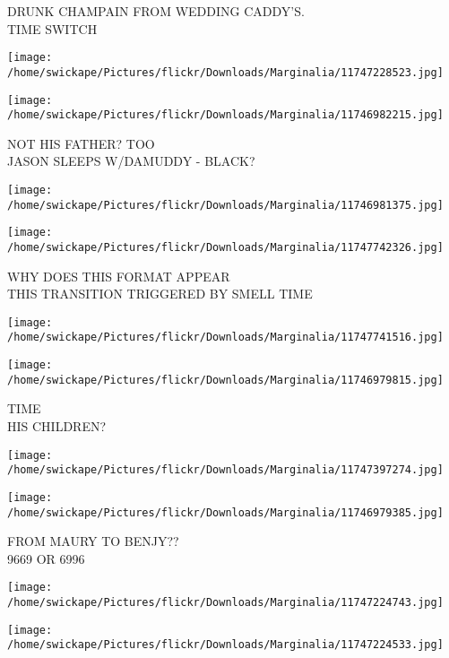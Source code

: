 \documentclass[10pt,letterpaper]{article}
\begin{document}
DRUNK CHAMPAIN FROM WEDDING CADDY'S.\\
TIME SWITCH\\
\pagebreak

\texttt{[image: /home/swickape/Pictures/flickr/Downloads/Marginalia/11747228523.jpg]}

\vspace{0.25in}
\texttt{[image: /home/swickape/Pictures/flickr/Downloads/Marginalia/11746982215.jpg]}

NOT HIS FATHER? TOO\\
JASON SLEEPS W/DAMUDDY {-} BLACK?\\
\pagebreak

\texttt{[image: /home/swickape/Pictures/flickr/Downloads/Marginalia/11746981375.jpg]}

\vspace{0.25in}
\texttt{[image: /home/swickape/Pictures/flickr/Downloads/Marginalia/11747742326.jpg]}

WHY DOES THIS FORMAT APPEAR\\
THIS TRANSITION TRIGGERED BY SMELL TIME\\
\pagebreak

\texttt{[image: /home/swickape/Pictures/flickr/Downloads/Marginalia/11747741516.jpg]}

\vspace{0.25in}
\texttt{[image: /home/swickape/Pictures/flickr/Downloads/Marginalia/11746979815.jpg]}

TIME\\
HIS CHILDREN?\\
\pagebreak

\texttt{[image: /home/swickape/Pictures/flickr/Downloads/Marginalia/11747397274.jpg]}

\vspace{0.25in}
\texttt{[image: /home/swickape/Pictures/flickr/Downloads/Marginalia/11746979385.jpg]}

FROM MAURY TO BENJY??\\
9669 OR 6996\\
\pagebreak

\texttt{[image: /home/swickape/Pictures/flickr/Downloads/Marginalia/11747224743.jpg]}

\vspace{0.25in}
\texttt{[image: /home/swickape/Pictures/flickr/Downloads/Marginalia/11747224533.jpg]}
\end{document}
